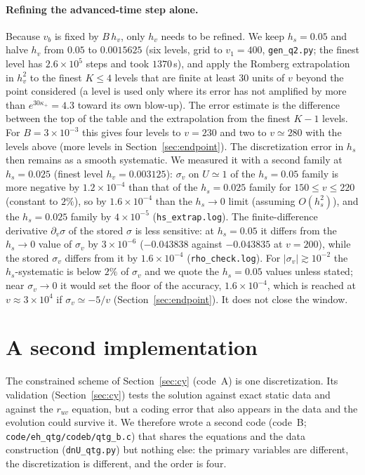 \documentclass[11pt]{article}
\begin{document}
\paragraph{Refining the advanced-time step alone.} Because $v_b$ is fixed by $B\,h_v$, only $h_v$ needs to be refined. We keep $h_s=0.05$ and halve $h_v$ from $0.05$ to $0.0015625$ (six levels, grid to $v_1=400$, \texttt{gen\_q2.py}; the finest level has $2.6\times10^{5}$ steps and took $1370\,$s), and apply the Romberg extrapolation in $h_v^{2}$ to the finest $K\le4$ levels that are finite at least $30$ units of $v$ beyond the point considered (a level is used only where its error has not amplified by more than $e^{30\kappa_+}=4.3$ toward its own blow-up). The error estimate is the difference between the top of the table and the extrapolation from the finest $K-1$ levels. For $B=3\times10^{-3}$ this gives four levels to $v=230$ and two to $v\simeq 280$ with the levels above (more levels in Section~\ref{sec:endpoint}). The discretization error in $h_s$ then remains as a smooth systematic. We measured it with a second family at $h_s=0.025$ (finest level $h_v=0.003125$): $\sigma_v$ on $U\simeq1$ of the $h_s=0.05$ family is more negative by $1.2\times10^{-4}$ than that of the $h_s=0.025$ family for $150\le v\le220$ (constant to $2\%$), so by $1.6\times10^{-4}$ than the $h_s\to0$ limit (assuming $O(h_s^{2})$), and the $h_s=0.025$ family by $4\times10^{-5}$ (\texttt{hs\_extrap.log}). The finite-difference derivative $\partial_v\sigma$ of the stored $\sigma$ is less sensitive: at $h_s=0.05$ it differs from the $h_s\to0$ value of $\sigma_v$ by $3\times10^{-6}$ ($-0.043838$ against $-0.043835$ at $v=200$), while the stored $\sigma_v$ differs from it by $1.6\times10^{-4}$ (\texttt{rho\_check.log}). For $|\sigma_v|\gtrsim10^{-2}$ the $h_s$-systematic is below $2\%$ of $\sigma_v$ and we quote the $h_s=0.05$ values unless stated; near $\sigma_v\to0$ it would set the floor of the accuracy, $1.6\times10^{-4}$, which is reached at $v\approx 3\times10^{4}$ if $\sigma_v\simeq-5/v$ (Section~\ref{sec:endpoint}). It does not close the window.

\section{A second implementation}
\label{sec:code2}

The constrained scheme of Section~\ref{sec:cy} (code~A) is one discretization. Its validation (Section~\ref{sec:cy}) tests the solution against exact static data and against the $r_{uv}$ equation, but a coding error that also appears in the data and the evolution could survive it. We therefore wrote a second code (code~B; \texttt{code/eh\_qtg/codeb/qtg\_b.c}) that shares the equations and the data construction (\texttt{dnU\_qtg.py}) but nothing else: the primary variables are different, the discretization is different, and the order is four.
\end{document}
